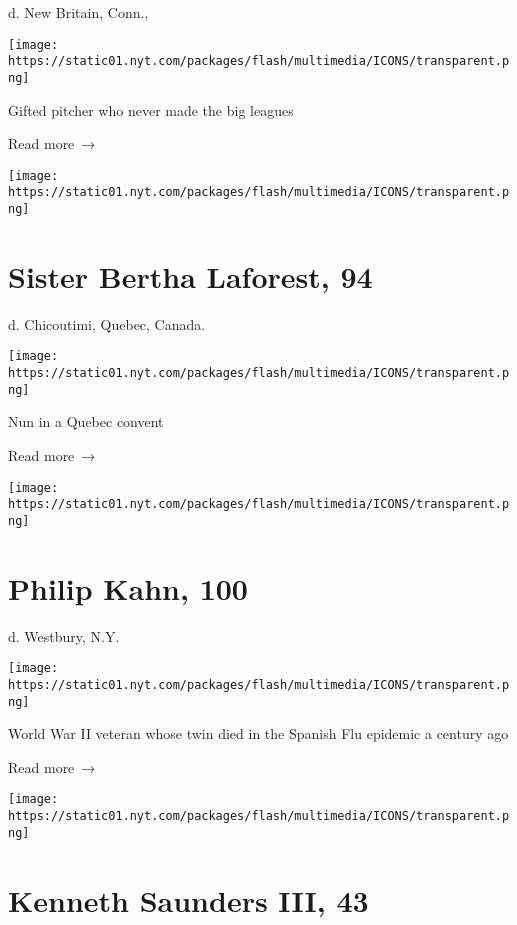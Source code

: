 d. New Britain, Conn.,

\texttt{[image: https://static01.nyt.com/packages/flash/multimedia/ICONS/transparent.png]}

Gifted pitcher who never made the big leagues

 Read more~→

\href{https://www.nytimes.com/2020/04/25/obituaries/bertha-laforest-dead-coronavirus.html}{}

\texttt{[image: https://static01.nyt.com/packages/flash/multimedia/ICONS/transparent.png]}

\hypertarget{sister-bertha-laforest-94}{%
\section{Sister Bertha Laforest, 94}\label{sister-bertha-laforest-94}}

d. Chicoutimi, Quebec, Canada.

\texttt{[image: https://static01.nyt.com/packages/flash/multimedia/ICONS/transparent.png]}

Nun in a Quebec convent

 Read more~→

\href{https://www.nytimes.com/2020/04/24/nyregion/philip-kahn-dead-coronavirus.html}{}

\texttt{[image: https://static01.nyt.com/packages/flash/multimedia/ICONS/transparent.png]}

\hypertarget{philip-kahn-100}{%
\section{Philip Kahn, 100}\label{philip-kahn-100}}

d. Westbury, N.Y.

\texttt{[image: https://static01.nyt.com/packages/flash/multimedia/ICONS/transparent.png]}

World War II veteran whose twin died in the Spanish Flu epidemic a
century ago

 Read more~→

\href{https://www.nytimes.com/2020/04/24/obituaries/kenneth-saunders-dead-coronavirus.html}{}

\texttt{[image: https://static01.nyt.com/packages/flash/multimedia/ICONS/transparent.png]}

\hypertarget{kenneth-saunders-iii-43}{%
\section{Kenneth Saunders III, 43}\label{kenneth-saunders-iii-43}}

